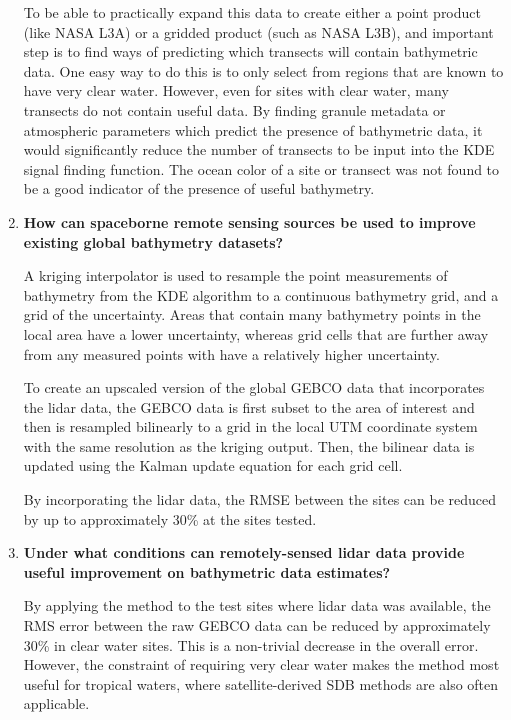 \begin{enumerate}
    To be able to practically expand this data to create either a point product (like NASA L3A) or a gridded product (such as NASA L3B), and important step is to find ways of predicting which transects will contain bathymetric data. One easy way to do this is to only select from regions that are known to have very clear water. However, even for sites with clear water, many transects do not contain useful data. By finding granule metadata or atmospheric parameters which predict the presence of bathymetric data, it would significantly reduce the number of transects to be input into the KDE signal finding function. The ocean color of a site or transect was not found to be a good indicator of the presence of useful bathymetry.

    \item \textbf{How can spaceborne remote sensing sources be used to improve existing global bathymetry datasets?}
    
    A kriging interpolator is used to resample the point measurements of bathymetry from the KDE algorithm to a continuous bathymetry grid, and a grid of the uncertainty. Areas that contain many bathymetry points in the local area have a lower uncertainty, whereas grid cells that are further away from any measured points with have a relatively higher uncertainty.

    To create an upscaled version of the global GEBCO data that incorporates the lidar data, the GEBCO data is first subset to the area of interest and then is resampled bilinearly to a grid in the local UTM coordinate system with the same resolution as the kriging output. Then, the bilinear data is updated using the Kalman update equation for each grid cell. 

    By incorporating the lidar data, the RMSE between the sites can be reduced by up to approximately 30\% at the sites tested.
    
    \item \textbf{Under what conditions can remotely-sensed lidar data provide useful improvement on bathymetric data estimates?}
    
    By applying the method to the test sites where lidar data was available, the RMS error between the raw GEBCO data can be reduced by approximately 30\% in clear water sites. This is a non-trivial decrease in the overall error. However, the constraint of requiring very clear water makes the method most useful for tropical waters, where satellite-derived SDB methods are also often applicable. 




\end{enumerate}

